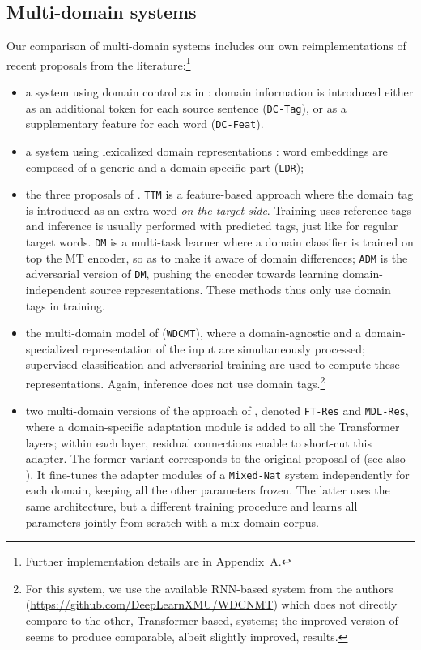 \documentclass[11pt,a4paper]{article}
\newcommand{\fyDone}[1]{\done[FY]\Todo[FY:]{\textcolor{orange}{#1}}}
\newcommand{\revision}[1]{#1}
\newcommand{\system}[1]{\texttt{{#1}}}
\begin{document}
\subsection{Multi-domain systems \label{ssec:systems}}
\fyDone{Remove Gated residual}
Our comparison of multi-domain systems includes our own reimplementations of recent proposals from the literature:\footnote{\revision{Further implementation details are in Appendix~A.}}
\begin{itemize}
\item a system using domain control as in \cite{Kobus17domaincontrol}: domain information is introduced either as an additional token for each source sentence (\system{DC-Tag}), or as a supplementary feature for each word (\system{DC-Feat}).
\item a system using lexicalized domain representations \cite{Pham19generic}: word embeddings are composed of a generic and a domain specific part (\system{LDR});\fyDone{why not LDR as in Minh's paper?}
\item the three proposals of . \system{TTM} is a feature-based approach where the domain tag is introduced as an extra word \textsl{on the target side}. Training uses reference tags and inference is usually performed with predicted tags, just like for regular target words. \system{DM} is a multi-task learner where a domain classifier is trained on top the MT encoder, so as to make it aware of domain differences; \system{ADM} is the adversarial version of \system{DM}, pushing the encoder towards learning domain-independent source representations. These methods thus only use domain tags in training.
\item the multi-domain model of  (\system{WDCMT}), where a domain-agnostic and a domain-specialized representation of the input are simultaneously processed; supervised classification and adversarial training are used to compute these representations. \revision{Again, inference does not use domain tags.}\footnote{For this system, we use the available RNN-based system from the authors (\url{https://github.com/DeepLearnXMU/WDCNMT}\fyDone{URLs}) which does not directly compare to the other, Transformer-based, systems; the improved version of \cite{Su19exploring} seems to produce comparable, albeit slightly improved, results.}\fyDone{Check this}
\item \revision{two multi-domain versions of the approach of \newcite{Bapna19simple}, denoted \system{FT-Res} and \system{MDL-Res}, where a domain-specific adaptation module is added to all the Transformer layers; within each layer, residual connections enable to short-cut this adapter. The former variant corresponds to the original proposal of \citet{Bapna19simple} \revision{(see also \cite{Sharaf20metalearning})}. It fine-tunes the adapter modules of a \system{Mixed-Nat} system independently for each domain, keeping all the other parameters frozen. The latter uses the same architecture, but a different training procedure and learns all parameters jointly from scratch with a mix-domain corpus.}

\end{itemize}
\end{document}
